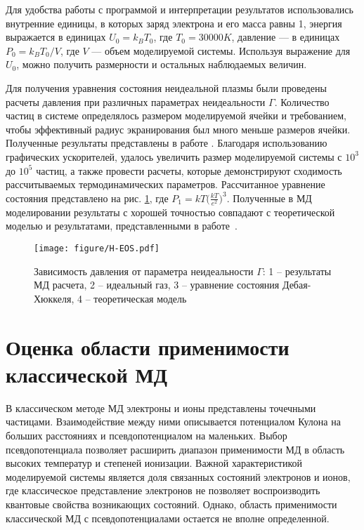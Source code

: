 Для удобства работы с программой и интерпретации результатов использовались внутренние единицы, в которых заряд электрона и его масса равны 1, энергия 
выражается в единицах $U_0=k_BT_0$, где $T_0 = 30000 K$, давление --- в единицах $P_0=k_BT_0/V$, где $V$ --- объем моделируемой системы. Используя выражение для
$U_0$, можно получить размерности и остальных наблюдаемых величин.

Для получения уравнения состояния неидеальной плазмы были проведены расчеты давления при различных параметрах неидеальности $\Gamma$. Количество частиц в системе
определялось размером моделируемой ячейки и требованием, чтобы эффективный радиус экранирования был много меньше размеров ячейки. 
Полученные результаты представлены в работе \cite{BLLMNS-TVT14}. Благодаря использованию графических ускорителей, удалось увеличить размер моделируемой системы с $10^3$ до
$10^5$ частиц, а также провести расчеты, которые демонстрируют сходимость рассчитываемых термодинамических параметров. Рассчитанное уравнение состояния представлено 
на рис. \ref{fig:eqState}, где $P_1 = kT \Big ( \frac{kT}{e^2} \Big )^3$. Полученные в МД моделировании результаты с хорошей точностью совпадают с теоретической моделью и результатами, представленными в работе~\cite{Norman1987eq}.
\begin{figure}[h!]
	\centering
	\texttt{[image: figure/H-EOS.pdf]}
	\caption{\small{Зависимость давления от параметра неидеальности $\Gamma$: 1 -- результаты МД расчета, 2 -- идеальный газ, 
			3 -- уравнение состояния Дебая-Хюккеля, 4 -- теоретическая модель \cite{Norman1987eq}}}
	\label{fig:eqState}
\end{figure}

\section{Оценка области применимости классической МД}

В классическом методе МД электроны и ионы представлены точечными частицами. Взаимодействие между ними описывается потенциалом Кулона на больших расстояниях и псевдопотенциалом на  маленьких. Выбор псевдопотенциала позволяет расширить диапазон применимости МД в область высоких температур и степеней ионизации. Важной характеристикой моделируемой системы является доля связанных состояний электронов и ионов, где классическое представление электронов не позволяет воспроизводить квантовые свойства возникающих состояний. Однако, область применимости классической МД с псевдопотенциалами остается не вполне определенной.

